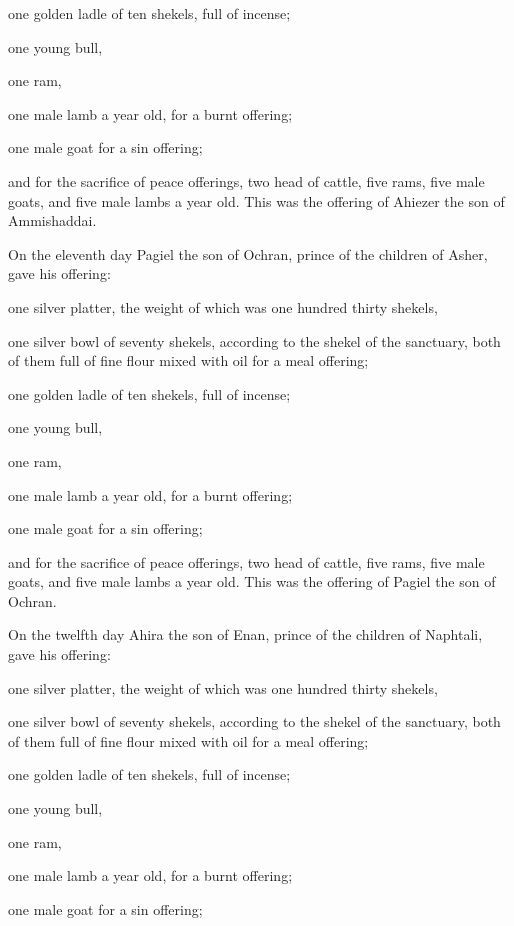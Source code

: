  one golden ladle of ten shekels, full of incense;

 one young bull,

one ram,

one male lamb a year old, for a burnt offering;

 one male goat for a sin offering;

 and for the sacrifice of peace offerings, two head of
cattle, five rams, five male goats, and five male lambs a year old. This
was the offering of Ahiezer the son of Ammishaddai.

 On the eleventh day Pagiel the son of Ochran, prince of
the children of Asher,  gave his offering:

one silver platter, the weight of which was one hundred thirty shekels,

one silver bowl of seventy shekels, according to the shekel of the
sanctuary, both of them full of fine flour mixed with oil for a meal
offering;

 one golden ladle of ten shekels, full of incense;

 one young bull,

one ram,

one male lamb a year old, for a burnt offering;

 one male goat for a sin offering;

 and for the sacrifice of peace offerings, two head of
cattle, five rams, five male goats, and five male lambs a year old. This
was the offering of Pagiel the son of Ochran.

 On the twelfth day Ahira the son of Enan, prince of the
children of Naphtali,  gave his offering:

one silver platter, the weight of which was one hundred thirty shekels,

one silver bowl of seventy shekels, according to the shekel of the
sanctuary, both of them full of fine flour mixed with oil for a meal
offering;

 one golden ladle of ten shekels, full of incense;

 one young bull,

one ram,

one male lamb a year old, for a burnt offering;

 one male goat for a sin offering;

